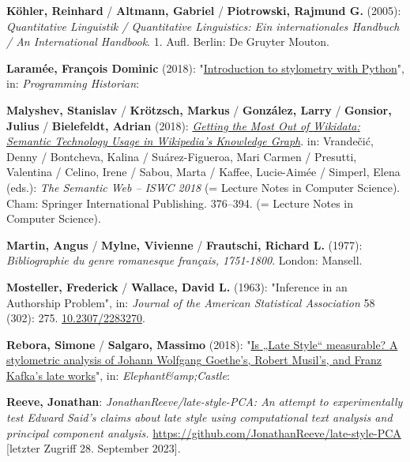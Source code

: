 \documentclass[
  12pt,
  letterpaper,
]{classicthesis}
\newlength{\cslhangindent}
\newenvironment{CSLReferences}[2] %
 {\begin{list}{}{%
  \setlength{\itemindent}{0pt}
  \setlength{\leftmargin}{0pt}
  \setlength{\parsep}{0pt}
  \ifodd #1
   \setlength{\leftmargin}{\cslhangindent}
   \setlength{\itemindent}{-1\cslhangindent}
  \fi
  \setlength{\itemsep}{#2\baselineskip}}}
 {\end{list}}
\begin{document}
\begin{CSLReferences}{1}{0}
\textbf{Köhler, Reinhard} / \textbf{Altmann, Gabriel} /
\textbf{Piotrowski, Rajmund G.} (2005): \emph{Quantitative {Linguistik}
/ {Quantitative} {Linguistics}: {Ein} internationales {Handbuch} / {An}
{International} {Handbook}}. 1. Aufl. Berlin: De Gruyter Mouton.

\textbf{Laramée, François Dominic} (2018):
"\href{https://programminghistorian.org/en/lessons/introduction-to-stylometry-with-python}{Introduction
to stylometry with {Python}}", in: \emph{Programming Historian}:

\textbf{Malyshev, Stanislav} / \textbf{Krötzsch, Markus} /
\textbf{González, Larry} / \textbf{Gonsior, Julius} /
\textbf{Bielefeldt, Adrian} (2018):
\emph{\href{https://doi.org/10.1007/978-3-030-00668-6_23}{Getting the
{Most} {Out} of {Wikidata}: {Semantic} {Technology} {Usage} in
{Wikipedia}'s {Knowledge} {Graph}}}. in: Vrandečić, Denny / Bontcheva,
Kalina / Suárez-Figueroa, Mari Carmen / Presutti, Valentina / Celino,
Irene / Sabou, Marta / Kaffee, Lucie-Aimée / Simperl, Elena (eds.):
\emph{The {Semantic} {Web} -- {ISWC} 2018} (= Lecture {Notes} in
{Computer} {Science}). Cham: Springer International Publishing.
376--394. (= Lecture {Notes} in {Computer} {Science}).

\textbf{Martin, Angus} / \textbf{Mylne, Vivienne} / \textbf{Frautschi,
Richard L.} (1977): \emph{Bibliographie du genre romanesque français,
1751-1800}. London: Mansell.

\textbf{Mosteller, Frederick} / \textbf{Wallace, David L.} (1963):
"Inference in an {Authorship} {Problem}", in: \emph{Journal of the
American Statistical Association} 58 (302): 275.
\href{https://doi.org/10.2307/2283270}{10.2307/2283270}.

\textbf{Rebora, Simone} / \textbf{Salgaro, Massimo} (2018):
"\href{https://www.academia.edu/37943274/Is_Late_Style_measurable_A_stylometric_analysis_of_Johann_Wolfgang_Goethe_s_Robert_Musil_s_and_Franz_Kafka_s_late_works}{Is
{„{Late} {Style}``} measurable? {A} stylometric analysis of {Johann}
{Wolfgang} {Goethe}'s, {Robert} {Musil}'s, and {Franz} {Kafka}'s late
works}", in: \emph{Elephant\&amp;Castle}:

\textbf{Reeve, Jonathan}: \emph{{JonathanReeve}/late-style-{PCA}: {An}
attempt to experimentally test {Edward} {Said}'s claims about late style
using computational text analysis and principal component analysis.}
\url{https://github.com/JonathanReeve/late-style-PCA} {[}letzter Zugriff
28. September 2023{]}.


\end{CSLReferences}
\end{document}
